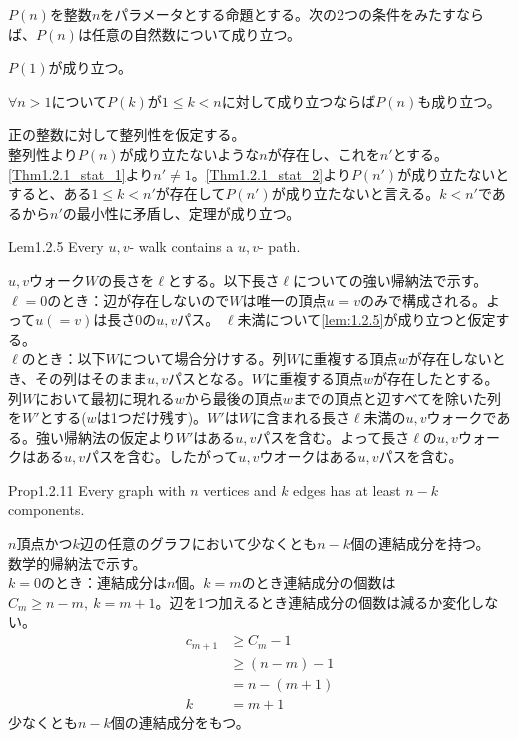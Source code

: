 \documentclass[dvipdfmx, leqno]{jsreport}
\begin{document}
\begin{souanswer}
    $P(n)$を整数$n$をパラメータとする命題とする。次の2つの条件をみたすならば、$P(n)$は任意の自然数について成り立つ。
\begin{enumerate_roman}
    \item $P(1)$が成り立つ。
    \item $\forall n> 1$について$P(k)$が$1\le k< n$に対して成り立つならば$P(n)$も成り立つ。
\end{enumerate_roman}
    正の整数に対して整列性を仮定する。\\
    整列性より$P(n)$が成り立たないような$n$が存在し、これを$n'$とする。
    \ref{Thm1.2.1_stat_1}より$n'\ne 1$。\ref{Thm1.2.1_stat_2}より$P(n')$が成り立たないとすると、ある$1\le k< n'$が存在して$P(n')$が成り立たないと言える。$k< n'$であるから$n'$の最小性に矛盾し、定理が成り立つ。
\end{souanswer}

\begin{soupractice}{Lem1.2.5}\label{lem:1.2.5}
    Every $u, v$- walk contains a $u, v$- path.
\end{soupractice}
\begin{souanswer}
    $u, v$ウォーク$W$の長さを$\ell$とする。以下長さ$\ell$についての強い帰納法で示す。\\
    $\ell= 0$のとき：辺が存在しないので$W$は唯一の頂点$u= v$のみで構成される。よって$u(= v)$は長さ0の$u, v$パス。
    $\ell$未満について\cref{lem:1.2.5}が成り立つと仮定する。\\
    $\ell$のとき：以下$W$について場合分けする。列$W$に重複する頂点$w$が存在しないとき、その列はそのまま$u, v$パスとなる。$W$に重複する頂点$w$が存在したとする。列$W$において最初に現れる$w$から最後の頂点$w$までの頂点と辺すべてを除いた列を$W'$とする($w$は1つだけ残す)。$W'$は$W$に含まれる長さ$\ell$未満の$u, v$ウォークである。強い帰納法の仮定より$W'$はある$u, v$パスを含む。よって長さ$\ell$の$u, v$ウォークはある$u, v$パスを含む。したがって$u, v$ウオークはある$u, v$パスを含む。
\end{souanswer}

\begin{soupractice}{Prop1.2.11}
    Every graph with $n$ vertices and $k$ edges has at least $n- k$ components.
\end{soupractice}
\begin{souanswer}
    $n$頂点かつ$k$辺の任意のグラフにおいて少なくとも$n- k$個の連結成分を持つ。\\
    数学的帰納法で示す。\\
    $k= 0$のとき：連結成分は$n$個。$k= m$のとき連結成分の個数は$C_m\ge n- m,\ k= m+ 1$。辺を1つ加えるとき連結成分の個数は減るか変化しない。
\begin{align*}
    c_{m+ 1}
    &\ge C_m- 1\\
    &\ge (n- m)- 1\\
    &= n- (m+ 1)\\
    k&= m+ 1
\end{align*}
    少なくとも$n- k$個の連結成分をもつ。
\end{souanswer}
\end{document}
